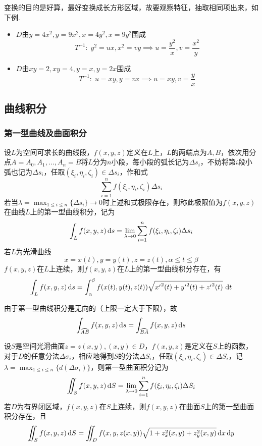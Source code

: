 \par 变换的目的是好算，最好变换成长方形区域，故要观察特征，抽取相同项出来，如下例.
\begin{example}
\begin{itemize}
	\item $D$由$y=4x^2,y=9x^2,x=4y^2,x=9y^2$围成
	\[T^{-1}:\;y^2=ux,x^2=vy\implies u=\frac{y^2}{x},v=\frac{x^2}{y}\]
	\item $D$由$xy=2,xy=4,y=x,y=2x$围成
	\[T^{-1}:\;u=xy,y=vx\implies u=xy,v=\frac{y}{x}\]
\end{itemize}
\end{example}

\subsection{曲线积分}
\subsubsection{第一型曲线及曲面积分}
\begin{definition}[第一型曲线积分]
设$L$为空间可求长的曲线段，$f(x,y,z)$定义在$L$上，$L$的两端点为$A,B$，依次用分点$A=A_0,A_1,\ldots,A_n=B$将$L$分为$n$小段，每小段的弧长记为$\Delta s_i$，不妨将第$i$段小弧也记为$\Delta s_i$，任取$(\xi_i,\eta_i,\zeta_i)\in\Delta s_i$，作和式
\[\sum_{i=1}^n f(\xi_i,\eta_i,\zeta_i)\Delta s_i\]
若当$\lambda=\max_{1\leq i\leq n}\{\Delta s_i\}\to 0$时上述和式极限存在，则称此极限值为$f(x,y,z)$在曲线$L$上的第一型曲线积分，记为
\[\int_Lf(x,y,z)\,\mathrm{d} s=\lim_{\lambda\to 0}\sum_{i=1}^nf(\xi_i,\eta_i,\zeta_i)\Delta s_i\]
若$L$为光滑曲线
\[x=x(t),y=y(t),z=z(t),\alpha\leq t\leq\beta\]
$f(x,y,z)$在$L$上连续，则$f(x,y,z)$在$L$上的第一型曲线积分存在，有
\[\int_Lf(x,y,z)\,\mathrm{d} s=\displaystyle\int_{\alpha}^{\beta}{f(x(t),y(t),z(t))\sqrt{{x'}^2(t)+{y'}^2(t)+{z'}^2(t)}}\,\,\mathrm{d} t\]
\end{definition}
由于第一型曲线积分是无向的（上限一定大于下限），故
\[\int_{\wideparen{AB}}f(x,y,z)\diff s=\int_{\wideparen{BA}}f(x,y,z)\diff s\]
\begin{definition}[第一型曲面积分]
设$S$是空间光滑曲面$z=z(x,y),(x,y)\in D$，$f(x,y,z)$是定义在$S$上的函数，对于$D$的任意分法$\Delta\sigma_i$，相应地得到$S$的分法$\Delta S_i$，任取$(\xi_i,\eta_i,\zeta_i)\in\Delta S_i$，记$\lambda=\max_{1\leq i\leq n}\{d(\Delta\sigma_i)\}$，则第一型曲面积分记为
\[\iint_S f(x,y,z)\,\mathrm{d} S=\lim_{\lambda\to 0}\sum_{i=1}^n f(\xi_i,\eta_i,\zeta_i)\Delta S_i\]
若$D$为有界闭区域，$f(x,y,z)$在$S$上连续，则$f(x,y,z)$在曲面$S$上的第一型曲面积分存在，且
\[\iint_S f(x,y,z)\,\mathrm{d} S=\iint_D f(x,y,z(x,y))\sqrt{1+z_x^2(x,y)+z_y^2(x,y)}\,\mathrm{d} x\,\mathrm{d} y\]
\end{definition}
